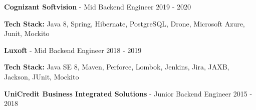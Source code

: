 \documentclass[11pt]{article}
\newcommand{\job}[3]{
    \begingroup
        \textbf{\small#1} - \small#2
        \hfill\color{black!70}\small{#3}
    \endgroup
}
\newcommand{\spacevv}{
    \vspace{2mm}
}
\begin{document}
\begin{paracol}{2}
{      \job{Cognizant Softvision}{Mid Backend Engineer}{2019 - 2020}
      \item \textbf{Tech Stack:} Java 8, Spring, Hibernate, PostgreSQL, Drone, Microsoft Azure, Junit, Mockito
      \spacevv
      \spacevv
      \spacevv

      \job{Luxoft}{Mid Backend Engineer}{2018 - 2019}
      \item \textbf{Tech Stack:} Java SE 8, Maven, Perforce, Lombok, Jenkins, Jira, JAXB, Jackson, JUnit, Mockito
      \spacevv
      \spacevv
      \spacevv

      \job{UniCredit Business Integrated Solutions}{Junior Backend Engineer}{2015 - 2018}
    }

    \end{paracol}
\end{document}
